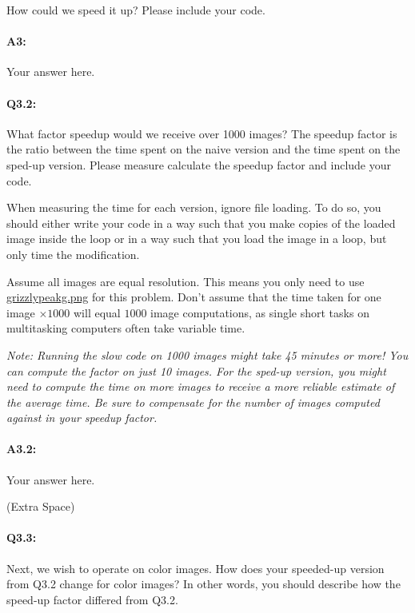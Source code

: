\documentclass[11pt]{article}
\begin{document}
How could we speed it up? Please include your code. \\

\paragraph{A3:} Your answer here.




\pagebreak
\paragraph{Q3.2:} What factor speedup would we receive over 1000 images? The speedup factor is the ratio between the time spent on the naive version and the time spent on the sped-up version. Please measure calculate the speedup factor and include your code.

When measuring the time for each version, ignore file loading. To do so, you should either write your code in a way such that you make copies of the loaded image inside the loop or in a way such that you load the image in a loop, but only time the modification.

Assume all images are equal resolution. This means you only need to use \href{grizzlypeakg.png}{grizzlypeakg.png} for this problem. Don't assume that the time taken for one image $\times1000$ will equal $1000$ image computations, as single short tasks on multitasking computers often take variable time.



\emph{Note: Running the slow code on 1000 images might take 45 minutes or more! You can compute the factor on just 10 images. For the sped-up version, you might need to compute the time on more images to receive a more reliable estimate of the average time. Be sure to compensate for the number of images computed against in your speedup factor.}

\paragraph{A3.2:} Your answer here.

 (Extra Space)


\pagebreak
\paragraph{Q3.3:} Next, we wish to operate on color images. How does your speeded-up version from Q3.2 change for color images? In other words, you should describe how the speed-up factor differed from Q3.2.
\end{document}
